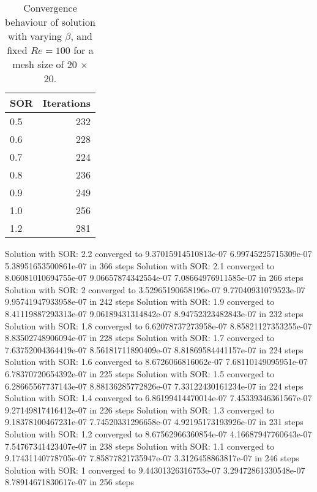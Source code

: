 \begin{table}
\begin{center}
\begin{tabular}{| l | r |}
\hline
SOR & Iterations \\
\hline

0.5 & 232\\
0.6 & 228\\
\hline
0.7 & 224\\
\hline
0.8 & 236\\
0.9 & 249\\
1.0 & 256\\
1.2 & 281\\

\hline
\end{tabular}
\caption{Convergence behaviour of solution with varying $\beta$, and fixed $Re = 100$ for a mesh size of 20 $\times$ 20.}
\label{norm}
\end{center}
\end{table}

 Solution with SOR: 2.2 converged to 9.37015914510813e-07  6.99745225715309e-07  5.38951653500861e-07 in 366 steps
 Solution with SOR: 2.1 converged to 8.06081010694755e-07  9.06657874342554e-07  7.08664976911585e-07 in 266 steps
 Solution with SOR: 2 converged to 3.52965190658196e-07  9.77040931079523e-07  9.95741947933958e-07 in 242 steps
 Solution with SOR: 1.9 converged to 8.41119887293313e-07  9.06189431314842e-07  8.94752323482843e-07 in 232 steps
 Solution with SOR: 1.8 converged to 6.62078737273958e-07  8.85821127353255e-07  8.83502748906094e-07 in 228 steps
 Solution with SOR: 1.7 converged to 7.63752004364419e-07  8.56181711890409e-07  8.81869584441157e-07 in 224 steps
 Solution with SOR: 1.6 converged to 8.6726066816062e-07  7.68110149095951e-07  6.78370720654392e-07 in 225 steps
 Solution with SOR: 1.5 converged to 6.28665567737143e-07  8.88136285772826e-07  7.33122430161234e-07 in 224 steps
 Solution with SOR: 1.4 converged to 6.86199414470014e-07  7.45339346361567e-07  9.27149817416412e-07 in 226 steps
 Solution with SOR: 1.3 converged to 9.18378100467231e-07  7.74520331296658e-07  4.92195173193926e-07 in 231 steps
 Solution with SOR: 1.2 converged to 8.67562966360854e-07  4.16687947760643e-07  7.54767341423407e-07 in 238 steps
 Solution with SOR: 1.1 converged to 9.17431140778705e-07  7.85877821735947e-07  3.3126458863817e-07 in 246 steps
 Solution with SOR: 1 converged to 9.44301326316753e-07  3.29472861330548e-07  8.78914671830617e-07 in 256 steps
